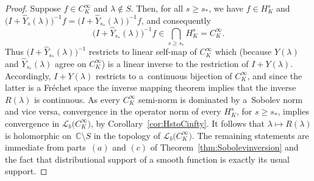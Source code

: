 \documentclass[pdftex]{sigma}
\numberwithin{equation}{section}
\newcommand{\CC}{{\mathbb C}}
\newcommand{\LL}{{\mathcal L}}
\begin{document}
 \begin{proof}
 	Suppose $f\in C^\infty_K$ and $\lambda\notin S$. Then, for all $s\ge s_*$,
 	we have	$f\in H^s_K$ and $\big(I+ \hat{Y}_{s}(\lambda)\big)^{-1}f=\big(I+\hat{Y}_{s_*}(\lambda)\big)^{-1}f$, and consequently
 	\begin{equation*}
 		\big(I+\hat{Y}_{s_*}(\lambda)\big)^{-1}f\in \bigcap_{s\ge s_*} H^s_K = C^\infty_K.
 	\end{equation*}
 	Thus $\big(I+\hat{Y}_{s_*}(\lambda)\big)^{-1}$ restricts to linear self-map of $C^\infty_K$ which
 	\big(because $Y(\lambda)$ and $\hat{Y}_{s_*}(\lambda)$ agree on $C^\infty_K$\big) is a linear inverse to the restriction of $I+ Y(\lambda)$. Accordingly, $I+ Y(\lambda)$ restricts to a~continuous bijection of $C^\infty_K$, and since the latter is a Fr\'echet space the inverse mapping theorem implies that the inverse $R(\lambda)$ is continuous.
 	As every $C^\infty_K$ semi-norm is dominated by a~Sobolev norm and
 	vice versa, convergence in the operator norm of every $H^s_K$, for $s\ge s_*$,
 	implies convergence in $\LL_b\big(C^\infty_K\big)$, by Corollary~\ref{cor:HstoCinfty}. It follows that $\lambda\mapsto R(\lambda)$ is holomorphic on~$\CC\setminus S$ in the topology of $\LL_b\big(C^\infty_K\big)$.
 	The remaining statements are immediate from parts~$(a)$ and $(c)$ of Theorem~\ref{thm:Sobolevinversion} and the fact that distributional support of a smooth function is exactly its usual support.
 \end{proof}
\end{document}
